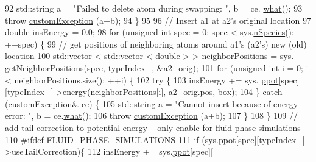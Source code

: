 \begin{DoxyCode}
92                 std::string a = \textcolor{stringliteral}{"Failed to delete atom during swapping: "}, b = ce.
      \hyperlink{classcustom_exception_aeb6ab5848b038adfc68fde86a512f691}{what}();
93                 \textcolor{keywordflow}{throw} \hyperlink{classcustom_exception}{customException} (a+b);
94     \}
95 
96                 \textcolor{comment}{// Insert a1 at a2's original location}
97     \textcolor{keywordtype}{double} insEnergy = 0.0;
98     \textcolor{keywordflow}{for} (\textcolor{keywordtype}{unsigned} \textcolor{keywordtype}{int} spec = 0; spec < sys.\hyperlink{classsim_system_ab5e2e9b6204de15520302fe1d51688dd}{nSpecies}(); ++spec) \{
99                 \textcolor{comment}{// get positions of neighboring atoms around a1's (a2's) new (old) location}
100                 std::vector < std::vector < double > > neighborPositions = sys.
      \hyperlink{classsim_system_a7ac49b2311cd8230df8d078a9d897b35}{getNeighborPositions}(spec, typeIndex\_, &a2\_orig);
101         \textcolor{keywordflow}{for} (\textcolor{keywordtype}{unsigned} \textcolor{keywordtype}{int} i = 0; i < neighborPositions.size(); ++i) \{
102                                                 \textcolor{keywordflow}{try} \{
103                                                                 insEnergy += sys.
      \hyperlink{classsim_system_a8d6271751a62f61edcf57f773540a4a3}{ppot}[spec][\hyperlink{classmc_move_acb731965547b0326ef318ec96da8b46a}{typeIndex\_}]->energy(neighborPositions[i], a2\_orig.\hyperlink{classatom_a3ae5f4880e7831d8b2c9fda72b4eb24a}{pos}, box);        
104                                                 \} \textcolor{keywordflow}{catch} (\hyperlink{classcustom_exception}{customException}& ce) \{
105                                                                 std::string a = \textcolor{stringliteral}{"Cannot insert because of
       energy error: "}, b = ce.\hyperlink{classcustom_exception_aeb6ab5848b038adfc68fde86a512f691}{what}();
106                                                                 \textcolor{keywordflow}{throw} 
      \hyperlink{classcustom_exception}{customException} (a+b);
107                                                 \}
108         \}
109         \textcolor{comment}{// add tail correction to potential energy -- only enable for fluid phase simulations}
110 \textcolor{preprocessor}{#ifdef FLUID\_PHASE\_SIMULATIONS}
111         \textcolor{keywordflow}{if} (sys.\hyperlink{classsim_system_a8d6271751a62f61edcf57f773540a4a3}{ppot}[spec][typeIndex\_]->useTailCorrection)\{
112                                                 insEnergy += sys.\hyperlink{classsim_system_a8d6271751a62f61edcf57f773540a4a3}{ppot}[spec][

\end{DoxyCode}
